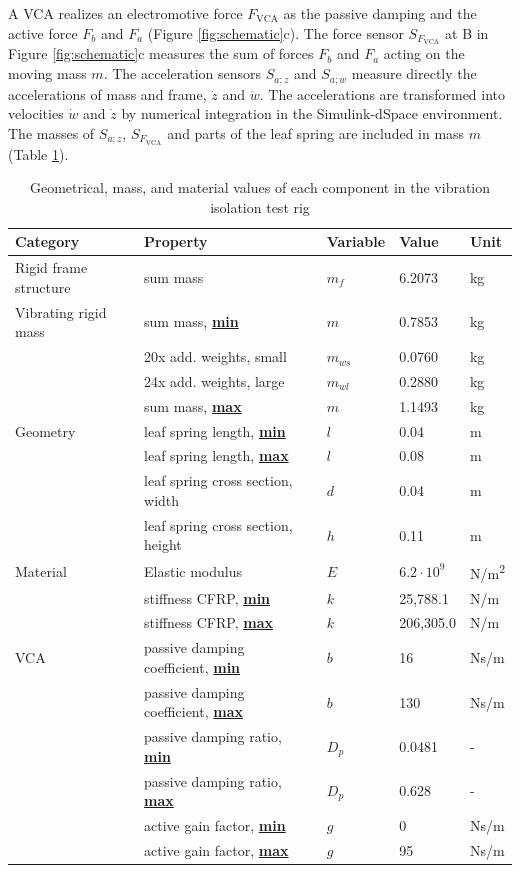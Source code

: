 \documentclass[10pt]{asme2ej}
\begin{document}
%
A VCA realizes an electromotive force $F_\mathrm{VCA}$ as the passive damping
and the active force $F_b$ and $F_a$ (Figure \ref{fig:schematic}c). 
%
The force sensor $S_{F_\mathrm{VCA}}$ at B in Figure \ref{fig:schematic}c measures the sum of forces $F_b$ and $F_a$ acting on the moving mass $m$. 
%
The acceleration sensors $S_{a;z}$ and $S_{a;w}$ measure directly the accelerations of mass and frame, $\ddot z$ and $\ddot w$. 
%
The accelerations are transformed into velocities $\dot w$ and $\dot z$ by numerical integration in the Simulink-dSpace environment. 
%
The masses of $S_{a;z}$, $S_{F_\mathrm{VCA}}$ and parts of the leaf spring are included in mass $m$ (Table \ref{table:rig}). 
%
\begin{table}
	\centering
	\captionsetup{width=.85\linewidth}
	\caption{Geometrical, mass, and material values of each component in the vibration isolation test rig} 
	\renewcommand{\arraystretch}{1.2}%
	\begin{tabular}{lllll}
		\hline
		Category&Property&Variable&Value&Unit\\
		\hline\hline
		Rigid frame structure&
		sum mass&$m_f$&6.2073&kg\\
		\hline
		Vibrating rigid mass&
		sum mass, \textbf{\underline{min}}&$m$&0.7853&kg\\
		&20x add. weights, small&$m_{ws}$&0.0760&kg\\
		&24x add. weights, large&$m_{wl}$&0.2880&kg\\
		&sum mass, \textbf{\underline{max}}&$m$&1.1493&kg\\
		\hline
		Geometry&leaf spring length, \textbf{\underline{min}}&$l$&0.04&m\\
		&leaf spring length, \textbf{\underline{max}}&$l$&0.08&m\\
		&leaf spring cross section, width&$d$&0.04&m\\
		&leaf spring cross section, height&$h$&0.11&m\\
		\hline
		Material&Elastic modulus&$E$&$6.2\cdot10^9$&N/m\textsuperscript{2}\\
		&stiffness CFRP, \textbf{\underline{min}}&$k$&25,788.1&N/m\\
		&stiffness CFRP, \textbf{\underline{max}}&$k$&206,305.0&N/m\\
		\hline
		VCA&passive damping coefficient, \textbf{\underline{min}}&$b$&16&Ns/m\\
		&passive damping coefficient, \textbf{\underline{max}}&$b$&130&Ns/m\\
		&passive damping ratio, \textbf{\underline{min}}&$D_p$&0.0481&-\\
		&passive damping ratio, \textbf{\underline{max}}&$D_p$&0.628&-\\
		&active gain factor, \textbf{\underline{min}}&$g$&0&Ns/m\\
		&active gain factor, \textbf{\underline{max}}&$g$&95&Ns/m\\
		\hline
	\end{tabular}
	\label{table:rig}
\end{table}
%
\end{document}
